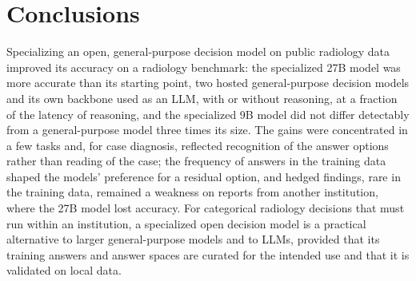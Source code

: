 \section{Conclusions}\label{sec:conclusions}

Specializing an open, general-purpose decision model on public radiology data improved its accuracy on a radiology benchmark: the specialized 27B model was more accurate than its starting point, two hosted general-purpose decision models and its own backbone used as an LLM, with or without reasoning, at a fraction of the latency of reasoning, and the specialized 9B model did not differ detectably from a general-purpose model three times its size. %
The gains were concentrated in a few tasks and, for case diagnosis, reflected recognition of the answer options rather than reading of the case; the frequency of answers in the training data shaped the models' preference for a residual option, and hedged findings, rare in the training data, remained a weakness on reports from another institution, where the 27B model lost accuracy. %
For categorical radiology decisions that must run within an institution, a specialized open decision model is a practical alternative to larger general-purpose models and to LLMs, provided that its training answers and answer spaces are curated for the intended use and that it is validated on local data.
